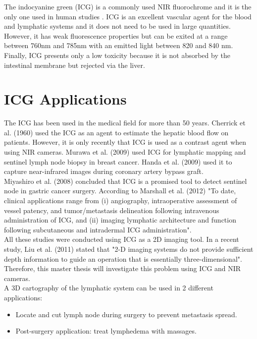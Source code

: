 The indocyanine green (ICG) is a commonly used NIR fluorochrome and it is the only one used in human studies \cite{marshall_near-infrared_2010}. ICG is an excellent vascular agent for the blood and lymphatic systems and it does not need to be used in large quantities. However, it has weak fluorescence properties but can be exited at a range between 760nm and 785nm with an emitted light between 820 and 840 nm. \\

Finally, ICG presents only a low toxicity \cite{m_adverse_1994} because it is not absorbed by the intestinal membrane but rejected via the liver.

\section{ICG Applications}
The ICG has been used in the medical field for more than 50 years. Cherrick et al. (1960) \cite{cherrick_indocyanine_1960} used the ICG as an agent to estimate the hepatic blood flow on patients.  However, it is only recently that ICG is used as a contrast agent when using NIR cameras. Murawa et al. (2009) \cite{murawa_sentinel_2009} used ICG for lymphatic mapping and sentinel lymph node biopsy in breast cancer. Handa et al. (2009) \cite{handa_preliminary_2009} used it to capture near-infrared images during coronary artery bypass graft. \\

Miyashiro et al. (2008) \cite{miyashiro_detection_2008} concluded that ICG is a promised tool to detect sentinel node in gastric cancer surgery. According to Marshall et al. (2012) \cite{marshall_near-infrared_2010} "To date, clinical applications range from (i) angiography, intraoperative assessment of vessel patency, and tumor/metastasis delineation following intravenous administration of ICG, and (ii) imaging lymphatic architecture and function following subcutaneous and intradermal ICG administration".\\

All these studies were conducted using ICG as a 2D imaging tool. In a recent study, Liu et al. (2011) \cite{liu_hands-free_2011} stated that "2-D imaging systems do not provide sufficient depth information to guide an operation that is essentially three-dimensional". Therefore, this master thesis will investigate this problem using ICG and NIR cameras. \\

A 3D cartography of the lymphatic system can be used in 2 different applications:
\begin{itemize}
  \item Locate and cut lymph node during surgery to prevent metastasis spread.
  \item Post-surgery application: treat lymphedema with massages. 
\end{itemize}

